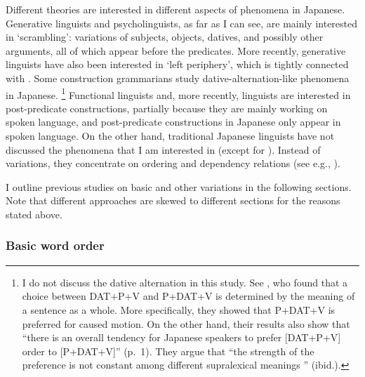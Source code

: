 Different theories are interested in different aspects of  phenomena in Japanese.
Generative linguists and psycholinguists, as far as I can see, are mainly interested in `scrambling':
 variations of subjects, objects, datives, and possibly other arguments,
all of which appear before the predicates.
More recently, generative linguists have also been interested in `left periphery',
which is tightly connected with .
Some construction grammarians study dative-alternation-like phenomena in Japanese.%
 \footnote{
 I do not discuss the dative alternation in this study.
 See ,
 who found that a choice between DAT+P+V and P+DAT+V is determined
 by the meaning of a sentence as a whole.
 More specifically, they showed that P+DAT+V is preferred for caused motion.
 On the other hand, their results also show that
 ``there is an overall tendency for Japanese speakers to prefer [DAT+P+V] order to [P+DAT+V]'' (p.~1).
 They argue that ``the strength of the preference is not constant among different supralexical meanings '' (ibid.).
 }
Functional linguists and, more recently,  linguists are interested in post-predicate constructions,
partially because they are mainly working on spoken language,
and post-predicate constructions in Japanese only appear in spoken language.
On the other hand,
traditional Japanese linguists have not discussed the  phenomena
that I am interested in (except for ).
Instead of  variations, they concentrate on  ordering and dependency relations (see e.g., ).

I outline previous studies on basic  and other variations in the following sections.
Note that different approaches are skewed to different sections
for the reasons stated above.



\subsubsection{Basic word order}

